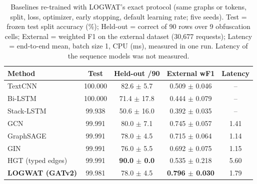 \begin{table}[t]
\centering
\caption{Baselines re-trained with LOGWAT's exact protocol (same graphs or tokens, split, loss, optimizer, early stopping, default learning rate; five seeds). Test = frozen test split accuracy (\%); Held-out = correct of 90 rows over 9 obfuscation cells; External = weighted F1 on the external dataset (30{,}677 requests); Latency = end-to-end mean, batch size 1, CPU (ms), measured in one run. Latency of the sequence models was not measured.}
\label{tab:method_comparison_extended}
\footnotesize
\setlength{\tabcolsep}{4pt}
\begin{tabular}{|l|c|c|c|c|}
\hline
\textbf{Method} & \textbf{Test} & \textbf{Held-out /90} & \textbf{External wF1} & \textbf{Latency} \\
\hline
TextCNN    & 100.000 & 82.6 $\pm$ 5.7  & 0.509 $\pm$ 0.046 & -- \\
Bi-LSTM    & 100.000 & 71.4 $\pm$ 17.8 & 0.444 $\pm$ 0.079 & -- \\
Stack-LSTM & 99.938  & 50.6 $\pm$ 16.0 & 0.392 $\pm$ 0.035 & -- \\
GCN        & 99.991  & 80.0 $\pm$ 7.1  & 0.745 $\pm$ 0.057 & 1.41 \\
GraphSAGE  & 99.991  & 78.0 $\pm$ 4.5  & 0.715 $\pm$ 0.064 & 1.14 \\
GIN        & 99.991  & 76.0 $\pm$ 5.5  & 0.692 $\pm$ 0.075 & 1.15 \\
HGT (typed edges) & 99.991 & \textbf{90.0 $\pm$ 0.0} & 0.535 $\pm$ 0.218 & 5.60 \\
\textbf{LOGWAT (GATv2)} & 99.981 & 78.0 $\pm$ 4.5 & \textbf{0.796 $\pm$ 0.030} & 1.79 \\
\hline
\end{tabular}
\end{table}

